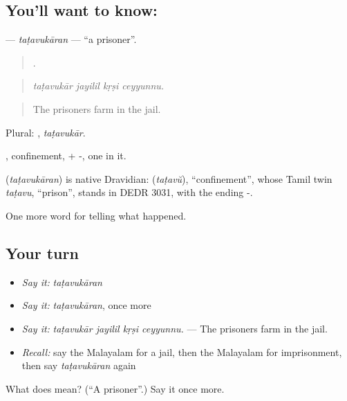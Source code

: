 \subsection*{You'll want to know: }
\textbf{} — \emph{taṭavukāran} — \textquotedblleft{}a prisoner\textquotedblright{}.

\begin{quote}
   .
\end{quote}

\begin{quote}
\emph{taṭavukār jayilil kṛṣi ceyyunnu.}
\end{quote}

\begin{quote}
The prisoners farm in the jail.
\end{quote}

Plural: , \emph{taṭavukār}.

, confinement, + -, one in it.

\begin{cousinweb}
\textbf{} (\emph{taṭavukāran}) is native Dravidian:  (\emph{taṭavŭ}), \textquotedblleft{}confinement\textquotedblright{}, whose Tamil twin \emph{taṭavu}, \textquotedblleft{}prison\textquotedblright{}, stands in DEDR 3031, with the ending -.
\end{cousinweb}

\begin{grammarlens}[title={What you've built}]
One more word for telling what happened.
\end{grammarlens}

\subsection*{Your turn}
\begin{itemize}
\raggedright
  \item \emph{Say it:} \emph{taṭavukāran}
  \item \emph{Say it:} \emph{taṭavukāran}, once more
  \item \emph{Say it:} \emph{taṭavukār jayilil kṛṣi ceyyunnu.} — The prisoners farm in the jail.
  \item \emph{Recall:} say the Malayalam for a jail, then the Malayalam for imprisonment, then say \emph{taṭavukāran} again
\end{itemize}

\begin{tcolorbox}[breakable,colback=teal!4,colframe=teal!35!black,title={Before you move on}]
What does  mean? (\textquotedblleft{}A prisoner\textquotedblright{}.) Say it once more.
\end{tcolorbox}
